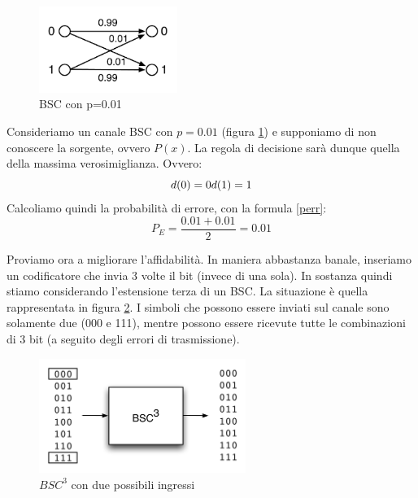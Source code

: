 \begin{figure}[htbp]
\begin{center}
	\includegraphics[width=0.4\textwidth]{img/bsc99.pdf}
\caption{BSC con p=0.01}
\label{fig:bsc99}
\end{center}
\end{figure}


Consideriamo un canale BSC con $p=0.01$ (figura \ref{fig:bsc99}) e supponiamo di non conoscere la sorgente, ovvero $P(x)$. La regola di decisione 
sarà dunque quella della massima verosimiglianza. Ovvero:
\[
 d(0)=0 \\ d(1)=1
\]
Calcoliamo quindi la probabilità di errore, con la formula \eqref{perr}:
\[
 P_E=\frac{0.01+0.01}{2}=0.01
\]

Proviamo ora a migliorare l'affidabilità. In maniera abbastanza banale, inseriamo un codificatore che invia 3 volte il bit (invece di una sola). In sostanza quindi stiamo considerando l'estensione terza di un BSC. La situazione è quella rappresentata in figura \ref{fig:bsc3}. I simboli che possono essere inviati sul canale sono solamente due (000 e 111), mentre possono essere ricevute tutte le 
combinazioni di 3 bit (a seguito degli errori di trasmissione).

\begin{figure}[htbp]
\begin{center}
	\includegraphics[width=0.6\textwidth]{img/bsc3.pdf}
\caption{$BSC^3$ con due possibili ingressi}
\label{fig:bsc3}
\end{center}
\end{figure}

